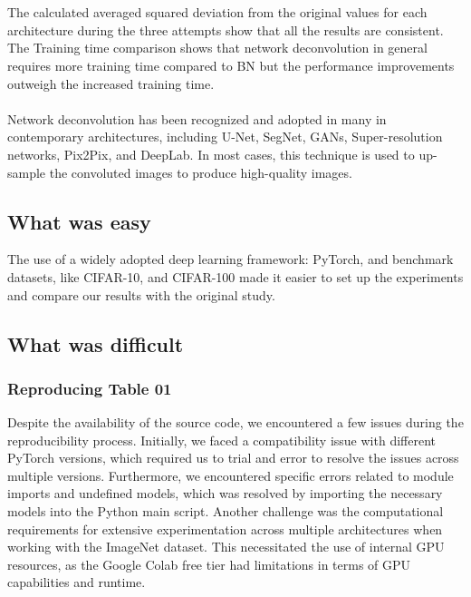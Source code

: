 \\\\
The calculated averaged squared deviation from the original values for each architecture during the three attempts show that all the results are consistent. The Training time comparison shows that network deconvolution in general requires more training time compared to BN but the performance improvements outweigh the increased training time. \\\\
Network deconvolution has been recognized and adopted in many in contemporary architectures, including U-Net\cite{unet-ronneberger2015unetconvolutionalnetworksbiomedical}, SegNet\cite{segnet}, GANs\cite{gans-goodfellow2014generativeadversarialnetworks}, Super-resolution networks\cite{srn-guo2023asconvsrfastlightweightsuperresolution}, Pix2Pix\cite{pix2pix-isola2018imagetoimagetranslationconditionaladversarial}, and DeepLab\cite{deeplab}. In most cases, this technique is used to up-sample the convoluted images to produce high-quality images.

\subsection{What was easy}

The use of a widely adopted deep learning framework: PyTorch, and benchmark datasets, like CIFAR-10, and CIFAR-100 made it easier to set up the experiments and compare our results with the original study. 

\subsection{What was difficult}
\subsubsection{Reproducing Table 01}

Despite the availability of the source code, we encountered a few issues during the reproducibility process. Initially, we faced a compatibility issue with different PyTorch versions, which required us to trial and error to resolve the issues across multiple versions. Furthermore, we encountered specific errors related to module imports and undefined models, which was resolved by importing the necessary models into the Python main script. Another challenge was the computational requirements for extensive experimentation across multiple architectures when working with the ImageNet dataset. This necessitated the use of internal GPU resources, as the Google Colab free tier had limitations in terms of GPU capabilities and runtime.


